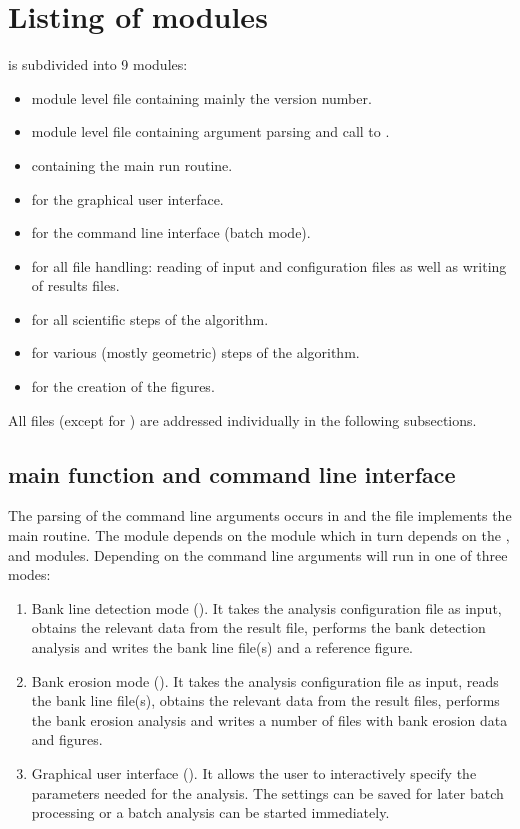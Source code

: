 \section{Listing of modules}

\dfastbe is subdivided into 9 modules:

\begin{itemize}
\item {} module level file containing mainly the version number.
\item {} module level file containing argument parsing and call to .
\item {} containing the main run routine.
\item {} for the graphical user interface.
\item {} for the command line interface (batch mode).
\item {} for all file handling: reading of input and configuration files as well as writing of results files.
\item {} for all scientific steps of the algorithm.
\item {} for various (mostly geometric) steps of the algorithm.
\item {} for the creation of the figures.
\end{itemize}

All files (except for ) are addressed individually in the following subsections.


\subsection{main function  and command line interface }

The parsing of the command line arguments occurs in  and the file  implements the main routine.
The  module depends on the  module which in turn depends on the ,  and  modules.
Depending on the command line arguments \dfastbe will run in one of three modes:

\begin{enumerate}
\item Bank line detection mode ().
It takes the analysis configuration file as input, obtains the relevant data from the \dflowfm result file, performs the bank detection analysis and writes the bank line file(s) and a reference figure.
\item Bank erosion mode ().
It takes the analysis configuration file as input, reads the bank line file(s), obtains the relevant data from the \dflowfm result files, performs the bank erosion analysis and writes a number of files with bank erosion data and figures.
\item Graphical user interface ().
It allows the user to interactively specify the parameters needed for the analysis.
The settings can be saved for later batch processing or a batch analysis can be started immediately.
\end{enumerate}

